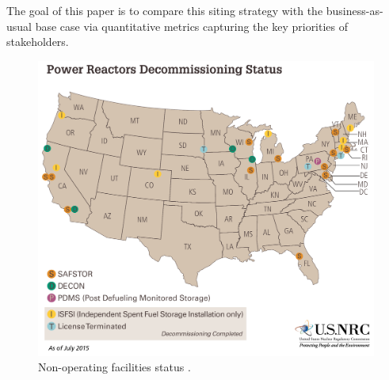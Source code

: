 The goal of this paper is to compare this siting strategy with the 
business-as-usual base case via quantitative metrics capturing the key 
priorities of stakeholders. 

\begin{figure}[!h] 
  \centering
  \includegraphics[width=0.8\columnwidth]{power-reactors-decommissioning}	
  \caption{Non-operating facilities status
  \cite{nuclear_regulatory_commission_nrc_2015}.}
  \label{fig:shutdown}
\end{figure}


